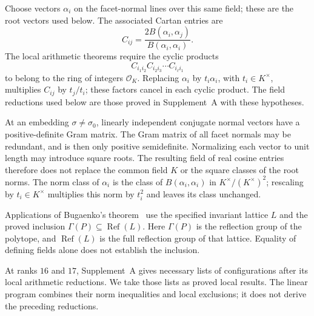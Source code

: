 \documentclass[11pt]{article}
\theoremstyle{definition}
\theoremstyle{remark}
\numberwithin{equation}{section}
\begin{document}
Choose vectors $\alpha_i$ on the facet-normal lines over this
same field; these are the root vectors used below. The associated
Cartan entries are
\begin{equation}\label{a:cartan}
 C_{ij}=\frac{2B(\alpha_i,\alpha_j)}{B(\alpha_i,\alpha_i)}.
\end{equation}
The local arithmetic theorems require the cyclic products
\begin{equation}\label{a:cycles}
             C_{i_1i_2}C_{i_2i_3}\cdots C_{i_\ell i_1}
\end{equation}
to belong to the ring of integers $\mathcal O_K$.
Replacing $\alpha_i$ by $t_i\alpha_i$, with $t_i\in K^\times$,
multiplies $C_{ij}$ by $t_j/t_i$; these factors cancel in each
cyclic product. The field reductions used below are those proved in
Supplement~A with these hypotheses.

At an embedding $\sigma\ne\sigma_0$, linearly independent conjugate
normal vectors have a positive-definite Gram matrix. The Gram matrix
of all facet normals may be redundant, and is then only positive
semidefinite. Normalizing each vector to unit length may introduce
square roots. The resulting field of real cosine entries therefore
does not replace the common field $K$ or the square classes of the
root norms. The norm class of $\alpha_i$ is the class of
$B(\alpha_i,\alpha_i)$ in $K^\times/(K^\times)^2$;
rescaling by $t_i\in K^\times$ multiplies this norm by $t_i^2$
and leaves its class unchanged.

Applications of Bugaenko's theorem~\cite{Bugaenko1984} use the
specified invariant lattice $L$ and the proved inclusion
$\Gamma(P)\subseteq\operatorname{Ref}(L)$. Here $\Gamma(P)$ is
the reflection group of the polytope, and $\operatorname{Ref}(L)$
is the full reflection group of that lattice. Equality of defining
fields alone does not establish the inclusion.

At ranks $16$ and $17$, Supplement~A gives necessary lists of
configurations after its local arithmetic reductions. We take those
lists as proved local results. The linear program combines their
norm inequalities and local exclusions; it does not derive the
preceding reductions.
\end{document}
